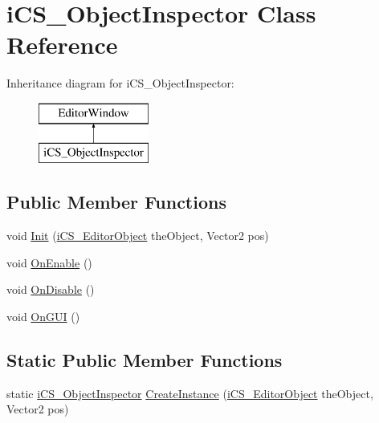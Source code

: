 \hypertarget{classi_c_s___object_inspector}{\section{i\+C\+S\+\_\+\+Object\+Inspector Class Reference}
\label{classi_c_s___object_inspector}
}
Inheritance diagram for i\+C\+S\+\_\+\+Object\+Inspector\+:\begin{figure}[H]
\begin{center}
\leavevmode
\includegraphics[height=2.000000cm]{classi_c_s___object_inspector}
\end{center}
\end{figure}
\subsection*{Public Member Functions}
\begin{DoxyCompactItemize}
\item 
void \hyperlink{classi_c_s___object_inspector_aefcedce2aaa48699360866b932bc9b45}{Init} (\hyperlink{classi_c_s___editor_object}{i\+C\+S\+\_\+\+Editor\+Object} the\+Object, Vector2 pos)
\item 
void \hyperlink{classi_c_s___object_inspector_a86379914d402642d4c60a0b09c3c8600}{On\+Enable} ()
\item 
void \hyperlink{classi_c_s___object_inspector_a4da72ddbe322051a14924a35fe2a4f8c}{On\+Disable} ()
\item 
void \hyperlink{classi_c_s___object_inspector_a7b425cd3fb72a1317839aee5f1145c61}{On\+G\+U\+I} ()
\end{DoxyCompactItemize}
\subsection*{Static Public Member Functions}
\begin{DoxyCompactItemize}
\item 
static \hyperlink{classi_c_s___object_inspector}{i\+C\+S\+\_\+\+Object\+Inspector} \hyperlink{classi_c_s___object_inspector_ad1da98982110cace8ece426e7618cef9}{Create\+Instance} (\hyperlink{classi_c_s___editor_object}{i\+C\+S\+\_\+\+Editor\+Object} the\+Object, Vector2 pos)
\end{DoxyCompactItemize}

